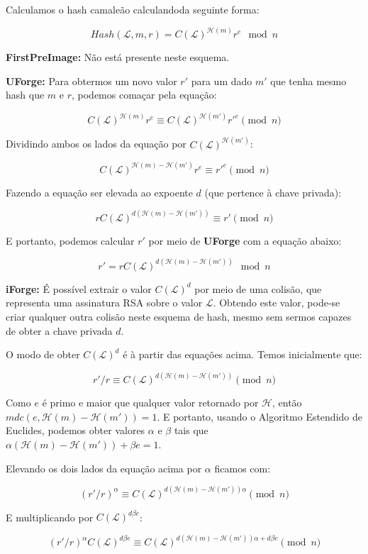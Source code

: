 \documentclass[a4paper]{article}
\begin{document}
Calculamos o hash camaleão calculandoda seguinte forma:

$$
Hash(\mathcal{L}, m, r) = C(\mathcal{L})^{\mathcal{H}(m)}r^e \mod n
$$

\textbf{FirstPreImage:} Não está presente neste esquema.

\textbf{UForge:} Para obtermos um novo valor $r'$ para um dado $m'$
que tenha mesmo hash que $m$ e $r$, podemos comaçar pela equação:

$$
C(\mathcal{L})^{\mathcal{H}(m)}r^e \equiv C(\mathcal{L})^{\mathcal{H}(m')}r'^e \pmod n
$$

Dividindo ambos os lados da equação por $C(\mathcal{L})^{\mathcal{H}(m')}$:

$$
C(\mathcal{L})^{\mathcal{H}(m)-\mathcal{H}(m')}r^e \equiv r'^e \pmod n
$$

Fazendo a equação ser elevada ao expoente $d$ (que pertence à chave
privada):

$$
rC(\mathcal{L})^{d(\mathcal{H}(m)-\mathcal{H}(m'))} \equiv r' \pmod n
$$

E portanto, podemos calcular $r'$ por meio de \textbf{UForge} com a
equação abaixo:

$$
r' = rC(\mathcal{L})^{d(\mathcal{H}(m)-\mathcal{H}(m'))} \mod n
$$

\textbf{iForge:} É possível extrair o valor $C(\mathcal{L})^d$ por
meio de uma colisão, que representa uma assinatura RSA sobre o valor
$\mathcal{L}$. Obtendo este valor, pode-se criar qualquer outra
colisão neste esquema de hash, mesmo sem sermos capazes de obter a
chave privada $d$.

O modo de obter $C(\mathcal{L})^d$ é à partir das equações
acima. Temos inicialmente que:

$$
r'/r \equiv C(\mathcal{L})^{d(\mathcal{H}(m)-\mathcal{H}(m'))} \pmod n
$$

Como $e$ é primo e maior que qualquer valor retornado por
$\mathcal{H}$, então $mdc(e, \mathcal{H}(m)-\mathcal{H}(m')) = 1$. E
portanto, usando o Algoritmo Estendido de Euclides, podemos obter
valores $\alpha$ e $\beta$ tais que
$\alpha(\mathcal{H}(m)-\mathcal{H}(m'))+\beta e = 1$.

Elevando os dois lados da equação acima por $\alpha$ ficamos com:

$$
(r'/r)^\alpha \equiv C(\mathcal{L})^{d(\mathcal{H}(m)-\mathcal{H}(m'))\alpha} \pmod n
$$

E multiplicando por $C(\mathcal{L})^{d\beta e}$:

$$
(r'/r)^\alpha C(\mathcal{L})^{d\beta e} \equiv C(\mathcal{L})^{d(\mathcal{H}(m)-\mathcal{H}(m'))\alpha + d\beta e} \pmod n
$$
\end{document}
